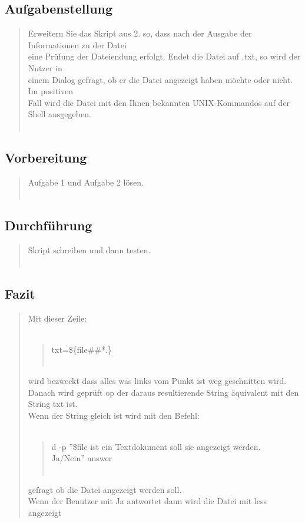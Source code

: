 	\subsection{Aufgabenstellung}
		\begin{quote}
			Erweitern Sie das Skript aus 2. so, dass nach der Ausgabe der Informationen zu der Datei\\
			eine Pr\"ufung der Dateiendung erfolgt. Endet die Datei auf .txt, so wird der Nutzer in\\
			einem Dialog gefragt, ob er die Datei angezeigt haben m\"ochte oder nicht. Im positiven\\
			Fall wird die Datei mit den Ihnen bekannten UNIX-Kommandos auf der Shell ausgegeben.\\ \\
		\end{quote}
	\subsection{Vorbereitung}
		\begin{quote}
			Aufgabe 1 und Aufgabe 2 l\"osen.\\ \\
		\end{quote}
	\subsection{Durchführung}
		\begin{quote}
			Skript schreiben und dann testen.\\ \\
		\end{quote}
	\subsection{Fazit}
		\begin{quote}
			Mit dieser Zeile:\\ \\
			\begin{quote}
				txt=\$\{file\#\#*.\}\\ \\
			\end{quote}
			wird bezweckt dass alles was links vom Punkt ist weg geschnitten wird.\\
			Danach wird gepr\"uft op der daraus resultierende String \"aquivalent mit den String txt ist.\\  
			Wenn der String gleich ist wird mit den Befehl:\\ \\
			\begin{quote}
				d -p ''\$file ist ein Textdokument soll sie angezeigt werden.\\ Ja/Nein'' answer\\ \\
			\end{quote}
			gefragt ob die Datei angezeigt werden soll.\\
			Wenn der Benutzer mit Ja antwortet dann wird die Datei mit less angezeigt\\
		\end{quote}
